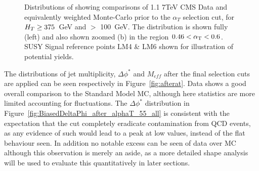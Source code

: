 \begin{figure}[htpb]
\centering
\begin{minipage}[b]{1.\textwidth}
\centering
{}
\hspace{0.2cm}
     \end{minipage}
    \caption{\label{fig:preselplotb}Distributions of \alt showing comparisons of 1.1  7TeV CMS Data and equivalently weighted Monte-Carlo prior to the $\alpha_{T}$ selection cut, for $H_{T}  \geq 375$~GeV and \MHT $>$ 100~GeV. The \alt distribution is shown fully (left) and also shown zoomed (b) in the region $0.46 < \alpha_{\text{T}} < 0.6$. SUSY Signal reference points LM4 \& LM6 shown for illustration of potential yields.}
\end{figure}


The distributions of jet multiplicity, $\Delta \phi^{*}$ and $M_{eff}$ after the final selection cuts are applied can be seen respectively in Figure~\ref{fig:afterat}. Data shows a good overall comparison to the Standard Model MC, although here statistics are more limited accounting for fluctuations. The $\Delta \phi^{*}$ distribution in Figure~\ref{fig:BiasedDeltaPhi_after_alphaT_55_all} is consistent with the expectation that the \alt cut completely eradicate contamination from QCD events, as any evidence of such would lead to a peak at low values, instead of the flat behaviour seen. In addition no notable excess can be seen of data over MC although this observation is merely an aside, as a more detailed shape analysis will be used to evaluate this quantitatively in later sections.

